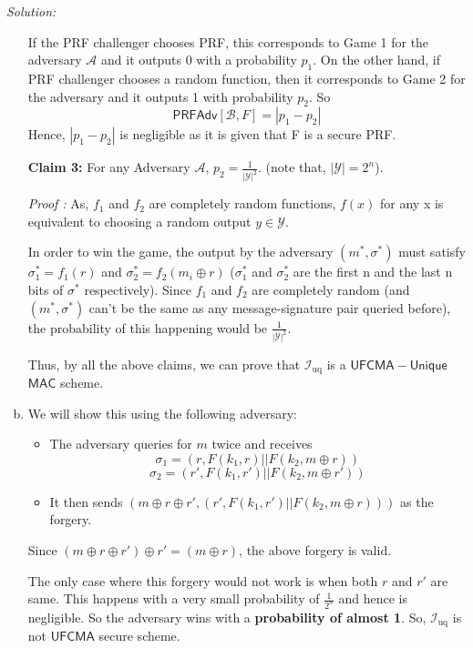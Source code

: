 \documentclass[a4paper, 11pt]{article}
\newenvironment{solution}
    {\textit{Solution:}}
    {\clearpage}
\newcommand{\prf}{\mathsf{PRFAdv}}
\newcommand{\mac}{\mathsf{MAC}}
\newcommand{\calA}{\mathcal{A}}
\newcommand{\calB}{\mathcal{B}}
\newcommand{\calI}{\mathcal{I}}
\newcommand{\calY}{\mathcal{Y}}
\begin{document}
\begin{solution}
\begin{enumerate}[(a)]
              If the PRF challenger chooses PRF, this corresponds to Game 1 for the adversary $\calA$ and it outputs 0 with a probability $p_1$. On the other hand, if PRF challenger chooses a random function, then it corresponds to Game 2 for the adversary and it outputs 1 with probability $p_2$. 
              So $$\prf[\calB, F] = |p_1 - p_2|$$
              Hence, $|p_1 - p_2|$ is negligible as it is given that F is a secure PRF.

              \textbf{Claim 3:} For any Adversary $\calA$, $p_2 = \frac{1}{|\calY|^2}$. (note that, $|\calY| = 2^n$).

              \textit{Proof :} As, $f_1$ and $f_2$ are completely random functions, $f(x)$ for any x is equivalent to choosing a random output $y \in \calY$.

              In order to win the game, the output by the adversary $(m^*, \sigma^*)$ must satisfy $\sigma^*_1 = f_1(r)$ and $\sigma^*_2 = f_2(m_i \oplus r)$ ($\sigma^*_1$ and $\sigma^*_2$ are the first n and the last n bits of $\sigma^*$ respectively). Since $f_1$ and $f_2$ are completely random (and $(m^*,\sigma^*)$ can't be the same as any message-signature pair queried before), the probability of this happening would be $\frac{1}{|\calY|^2}$.

              Thus, by all the above claims, we can prove that $\calI_\text{uq}$ is a $\mathsf{UFCMA-Unique}$ $\mac$ scheme.

        \item We will show this using the following adversary:

              \begin{itemize}
                  \item The adversary queries for $m$ twice and receives 
                  $$\sigma_1 = (r,F(k_1, r) || F(k_2, m \oplus r))$$ 
                  $$\sigma_2 = (r', F(k_1, r') || F(k_2, m \oplus r'))$$
                  \item It then sends $(m \oplus r \oplus r', (r', F(k_1, r') || F(k_2, m \oplus r)))$ as the forgery.
              \end{itemize}

              Since $(m \oplus r \oplus r') \oplus r' = (m \oplus r)$, the above forgery is valid. 
              
              The only case where this forgery would not work is when both $r$ and $r'$ are same. This happens with a very small probability of $\frac{1}{2^{n}}$ and hence is negligible. So the adversary wins with a \textbf{probability of almost 1}.
              So, $\calI_\text{uq}$ is not $\mathsf{UFCMA}$ secure scheme.
              
    \end{enumerate}
\end{solution}
\end{document}
